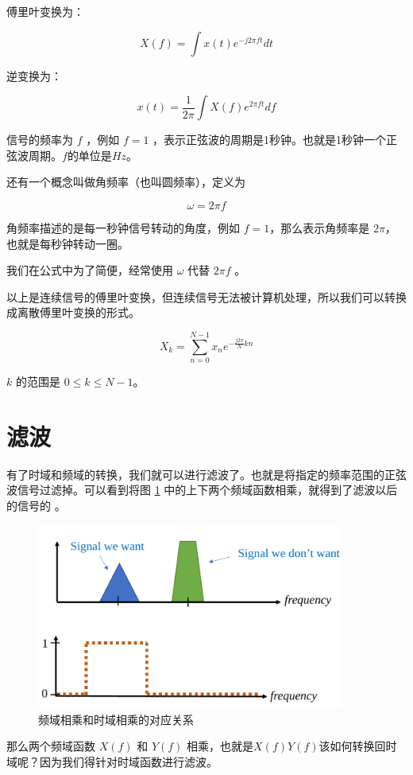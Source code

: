 \documentclass[lang=cn,newtx,10pt,scheme=chinese]{elegantbook}
\begin{document}
傅里叶变换为：

$$
X(f) = \int{x(t)e^{-j 2 \pi f t}}dt
$$

逆变换为：

$$
x(t) = \frac{1}{2\pi}\int X(f)e^{2\pi ft}df
$$

信号的频率为 $f$ ，例如 $f=1$ ，表示正弦波的周期是1秒钟。也就是1秒钟一个正弦波周期。$f$的单位是$Hz$。

还有一个概念叫做角频率（也叫圆频率），定义为

$$
\omega = 2\pi f
$$

角频率描述的是每一秒钟信号转动的角度，例如 $f=1$，那么表示角频率是 $2\pi$，也就是每秒钟转动一圈。

我们在公式中为了简便，经常使用 $\omega$ 代替 $2\pi f$ 。

以上是连续信号的傅里叶变换，但连续信号无法被计算机处理，所以我们可以转换成离散傅里叶变换的形式。

$$
X_k = \sum_{n=0}^{N-1}x_n e^{-\frac{j2\pi}{N}kn}
$$

$k$ 的范围是 $0 \leq k \leq N-1$。

\section{滤波}

有了时域和频域的转换，我们就可以进行滤波了。也就是将指定的频率范围的正弦波信号过滤掉。可以看到将图 \ref{fig:filter} 中的上下两个频域函数相乘，就得到了滤波以后的信号的  。

\begin{figure}[!htb]
\centering
\includegraphics[width=0.9\textwidth]{filter.pdf}
\caption{频域相乘和时域相乘的对应关系}
\label{fig:filter}
\end{figure}

那么两个频域函数 $X(f)$ 和 $Y(f)$ 相乘，也就是$X(f)Y(f)$该如何转换回时域呢？因为我们得针对时域函数进行滤波。
\end{document}
